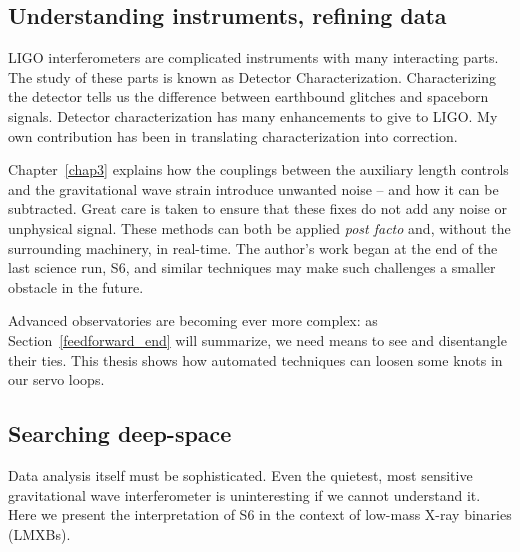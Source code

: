         \subsection{Understanding instruments, refining data}
        \label{instrumental_understanding_data_refinements}



LIGO interferometers are complicated instruments with many interacting parts.
The study of these parts is known as Detector Characterization.
Characterizing the detector tells us the difference between earthbound glitches and spaceborn signals. 
Detector characterization has many enhancements to give to LIGO.
My own contribution has been in translating characterization into correction.

Chapter~\ref{chap3} explains how the couplings between the auxiliary length controls and the gravitational wave strain introduce unwanted noise -- and how it can be subtracted.
Great care is taken to ensure that these fixes do not add any noise or unphysical signal.
These methods can both be applied \textit{post facto} and, without the surrounding machinery, in real-time.
The author's work began at the end of the last science run, S6, and similar techniques may make such challenges a smaller obstacle in the future.

Advanced observatories are becoming ever more complex: as Section~\ref{feedforward_end} will summarize, we need means to see and disentangle their ties.
This thesis shows how automated techniques can loosen some knots in our servo loops.

        \subsection{Searching deep-space}
        \label{searching_space}

Data analysis itself must be sophisticated.
Even the quietest, most sensitive gravitational wave interferometer is uninteresting if we cannot understand it.
Here we present the interpretation of S6 in the context of low-mass X-ray binaries (LMXBs). 

